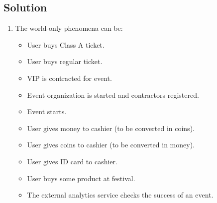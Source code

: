 \documentclass[12pt, a4paper]{report}
\newtheorem[style=M,bodystyle=\normalfont]{theorem}{Theorem}
\newtheorem[style=M,bodystyle=\normalfont]{corollary}{Corollary}
\newtheorem[style=M,bodystyle=\normalfont]{lemma}{Lemma}
\newtheorem[style=M,bodystyle=\normalfont]{definition}{Definition}
\begin{document}
    \subsection*{Solution}
        \begin{enumerate}
            \item The world-only phenomena can be: 
                \begin{itemize}
                    \item User buys Class A ticket.
                    \item User buys regular ticket.
                    \item VIP is contracted for event.
                    \item Event organization is started and contractors registered.
                    \item Event starts.
                    \item User gives money to cashier (to be converted in coins).
                    \item User gives coins to cashier (to be converted in money).
                    \item User gives ID card to cashier.
                    \item User buys some product at festival.
                    \item The external analytics service checks the success of an event.
                \end{itemize}


\end{enumerate}
\end{document}
